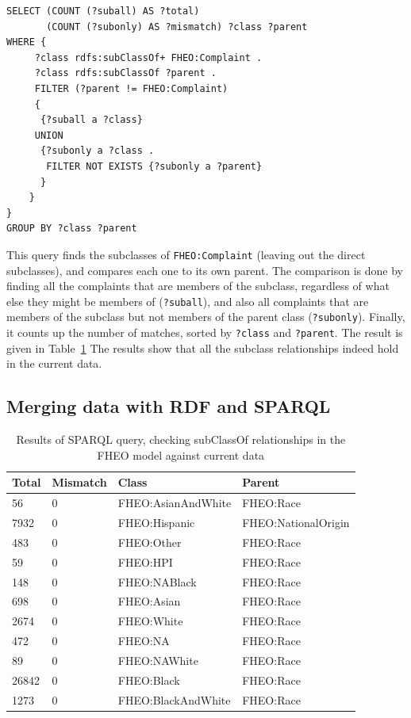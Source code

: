 \begin{lstlisting}
SELECT (COUNT (?suball) AS ?total) 
       (COUNT (?subonly) AS ?mismatch) ?class ?parent
WHERE {
     ?class rdfs:subClassOf+ FHEO:Complaint .
     ?class rdfs:subClassOf ?parent .
     FILTER (?parent != FHEO:Complaint)
     {
      {?suball a ?class}
     UNION
      {?subonly a ?class .
       FILTER NOT EXISTS {?subonly a ?parent}
      }
    }
}
GROUP BY ?class ?parent
\end{lstlisting}

This query finds the subclasses of \texttt{FHEO:Complaint} (leaving out the
direct subclasses), and compares each one to its own parent. The
comparison is done by finding all the complaints that are members of the
subclass, regardless of what else they might be members of (\texttt{?suball}),
and also all complaints that are members of the subclass but not members
of the parent class (\texttt{?subonly}). Finally, it counts up the number of
matches, sorted by \texttt{?class} and \texttt{?parent}. The result is given in Table~\ref{tab:ch10.1}
The results show that all the subclass relationships indeed hold in the
current data.

\subsection{Merging data with RDF and SPARQL}



\begin{table}
\caption{Results of SPARQL query, checking subClassOf relationships in
the FHEO model against current data}
\begin{tabular}{|llll|}
\hline
Total&Mismatch&Class&Parent\\
\hline
56&0&FHEO:AsianAndWhite&FHEO:Race\\
7932&0&FHEO:Hispanic&FHEO:NationalOrigin\\
483&0&FHEO:Other&FHEO:Race\\
59&0&FHEO:HPI&FHEO:Race\\
148&0&FHEO:NABlack&FHEO:Race\\
698&0&FHEO:Asian&FHEO:Race\\
2674&0&FHEO:White&FHEO:Race\\
472&0&FHEO:NA&FHEO:Race\\
89&0&FHEO:NAWhite&FHEO:Race\\
26842&0&FHEO:Black&FHEO:Race\\
1273&0&FHEO:BlackAndWhite&FHEO:Race\\

\hline
\end{tabular}
\label{tab:ch10.1}
\end{table}

